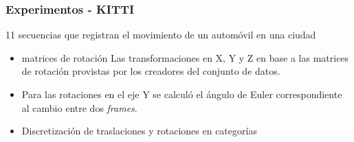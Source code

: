 \documentclass{beamer}
\begin{document}
\begin{frame}
\frametitle{Experimentos - KITTI}
\vfill
11 secuencias que registran el movimiento de un automóvil en una ciudad\vfill
\begin{figure}
\centering
{}
\end{figure}
\vfill
\begin{itemize}
    \item matrices de rotación Las transformaciones en X, Y y Z en base a las matrices de rotación provistas por los creadores del conjunto de datos.
    \item Para las rotaciones en el eje Y se calculó el ángulo de Euler correspondiente al cambio entre dos \textit{frames}.
    \item Discretización de traslaciones y rotaciones en categorías
\end{itemize}
\vfill
\end{frame}
\end{document}

